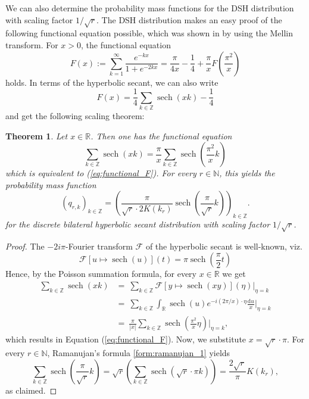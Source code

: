 \documentclass[12pt]{amsart}
\newtheorem{theorem}{Theorem}[section]
\theoremstyle{definition}
\theoremstyle{remark}
\numberwithin{equation}{section}
\newcommand{\1}{\mathbbm{1}}
\begin{document}
We can also determine the probability mass functions for the DSH distribution with scaling factor $1/\sqrt{r}$. 
The DSH distribution makes an easy proof of the following functional equation possible, which was shown in \cite{kirschenhofer_1996} by using the Mellin transform. For $x > 0$, the functional equation
\begin{equation}\label{eq:functional_F}
F(x) := \sum_{k=1}^\infty \frac{e^{-kx}}{1 + e^{-2kx}} =  \frac{\pi}{4x} - \frac{1}{4} + \frac{\pi}{x}F\left(\frac{\pi^2}{x}\right)
\end{equation}
holds. In terms of the hyperbolic secant, we can also write 
$$
F(x) = \frac{1}{4} \sum_{k\in\mathbb{Z}} \operatorname{sech}(xk) - \frac{1}{4}
$$
and get the following scaling theorem:

\begin{theorem}
Let $x \in \mathbb{R}$. Then one has the functional equation
\begin{equation}
\sum_{k \in \mathbb{Z}} \operatorname{sech}\left(xk\right) = \frac{\pi}{x} \sum_{k \in \mathbb{Z}} \operatorname{sech}\left(\frac{\pi^2}{x} k \right)
\end{equation}
which is equivalent to (\ref{eq:functional_F}). For every $r \in \mathbb{N}$, this yields the probability mass function
$$
\left(q_{r,k} \right)_{k \in \mathbb{Z}} = \left(\frac{\pi}{\sqrt{r} \cdot 2K(k_r)} \operatorname{sech}\left( \frac{\pi}{\sqrt{r}} k \right) \right)_{k \in \mathbb{Z}}.
$$
for the discrete bilateral hyperbolic secant distribution with scaling factor $1/\sqrt{r}$.
\end{theorem}

\begin{proof}
The $-2i \pi$-Fourier transform $\mathcal{F}$ of the hyperbolic secant is well-known, viz.
$$
\mathcal{F}[u \mapsto \operatorname{sech}(u)](t) = \pi \operatorname{sech} \left(\frac{\pi}{2}t\right)
$$
Hence, by the Poisson summation formula, for every $x \in \mathbb{R}$ we get
\begin{align*}
\sum_{k \in \mathbb{Z}} \operatorname{sech}(xk) &=\ \sum_{k \in \mathbb{Z}} \mathcal{F}\left[y \mapsto \operatorname{sech}(xy)\right](\eta)\big|_{\eta = k}\\
&=\ \sum_{k\in \mathbb{Z}} \int_\mathbb{R} \operatorname{sech}(u) e^{-i(2\pi/x) \cdot \eta} \frac{\mathrm{d}u}{x}\big|_{\eta = k}\\
&=\ \frac{\pi}{|x|} \sum_{k \in \mathbb{Z}} \operatorname{sech}\left(\frac{\pi^2}{x}\eta\right) \big|_{\eta = k},
\end{align*}
which results in Equation (\ref{eq:functional_F}). Now, we substitute $x = \sqrt{r} \cdot \pi$. For every $r \in \mathbb{N}$, Ramanujan's formula \ref{form:ramanujan_1} yields
$$
\sum_{k\in \mathbb{Z}} \operatorname{sech}\left(\frac{\pi}{\sqrt{r}} k \right) = \sqrt{r} \left(\sum_{k \in \mathbb{Z}} \operatorname{sech}\left(\sqrt{r} \cdot \pi k \right)\right) = \frac{2\sqrt{r}}{\pi}K\left(k_r\right),
$$
as claimed.
\end{proof}
\end{document}
